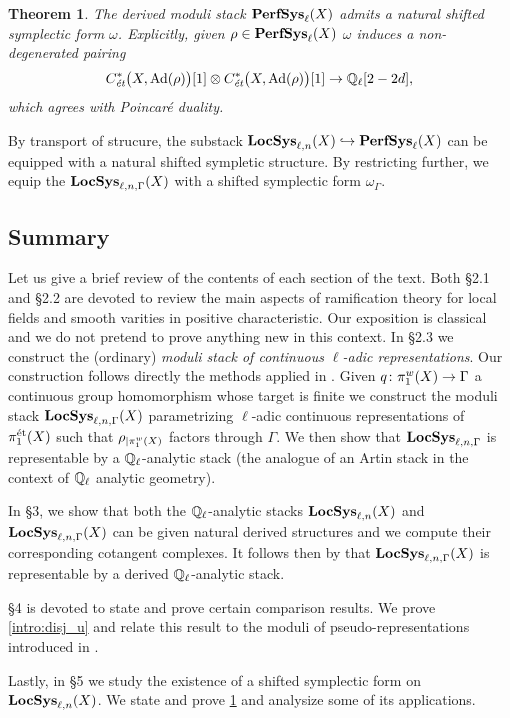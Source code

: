 \documentclass[10pt,a4paper]{amsart}
\numberwithin{equation}{subsection}
\theoremstyle{plain}
\newtheorem{theorem}{Theorem}[section]
\theoremstyle{definition}
\theoremstyle{remark}
\numberwithin{equation}{section}
\begin{document}
\begin{theorem} \label{intro:shifted}
The derived moduli stack $\mathbf{PerfSys}_{\ell}(X)$ admits a natural shifted symplectic form $\omega$. Explicitly, given $\rho \in \mathbf{PerfSys}_{\ell}(X)$
$\omega$ induces a non-degenerated pairing
    \[
        C^*_{\emph{\text{\'et}}} \big(X, \mathrm{Ad}(\rho) \big)[1] \otimes C^*_{\emph{\text{\'et}}} \big(X, \mathrm{Ad}(\rho ) \big)[1]
        \to \mathbb Q_\ell [2-2d],
    \]
which agrees with Poincar\'e duality.
\end{theorem}

By transport of strucure, the substack $\mathbf{LocSys}_{\ell, n}(X) \hookrightarrow \mathbf{PerfSys}_{\ell}(X)$ can be equipped with a natural shifted sympletic structure. By restricting further, we equip
the $\mathbf{LocSys}_{\ell, n, \Gamma}(X)$ with a shifted symplectic form $\omega_\Gamma$.



\subsection{Summary}
Let us give a brief review of the contents of each section of the text.
Both \S 2.1 and \S 2.2 are devoted to review the main aspects of ramification theory for local fields and smooth varities in positive characteristic. Our exposition is classical and we do 
not pretend
to prove anything new in this context. In \S 2.3
we construct the (ordinary) \emph{moduli stack of continuous $\ell$-adic representations}. Our construction follows directly the methods applied in \cite{me1}. Given $q
\colon \pi_1^w(X) 
\to \Gamma$ a continuous group homomorphism whose target is finite we construct the moduli stack $\mathbf{LocSys}_{\ell, n, \Gamma}(X)$ parametrizing $\ell$-adic continuous representations of $\pi_1^{\text{\'et}}(X)$
such that $\rho_{\vert \pi_1^w(X)} $ factors through $\Gamma$.
We then show that $\mathbf{LocSys}_{\ell, n, \Gamma}$ is representable
by a $\mathbb{Q}_\ell$-analytic stack (the analogue of an Artin stack in the context of $\mathbb{Q}_\ell$ analytic geometry).


In \S 3, we show that both the $\mathbb{Q}_\ell$-analytic stacks $\mathbf{LocSys}_{\ell, n}(X)$ and $\mathbf{LocSys}_{\ell, n, \Gamma}(X)$ can be given natural derived structures and we compute their corresponding cotangent complexes. 
It follows then by \cite[Theorem 7.1]{porta_rep} that $\mathbf{LocSys}_{\ell, n, \Gamma}(X)$ is representable by a derived $\mathbb{Q}_\ell$-analytic stack.

\S 4 is devoted to state and prove certain comparison results. We prove \cref{intro:disj_u} and relate this result to the moduli of pseudo-representations introduced in \cite{chenevier}.


Lastly, in \S 5 we study the existence of a shifted symplectic form on $\mathbf{LocSys}_{\ell, n}(X)$. We state and prove \cref{intro:shifted} and analysize some of its applications.
\end{document}
